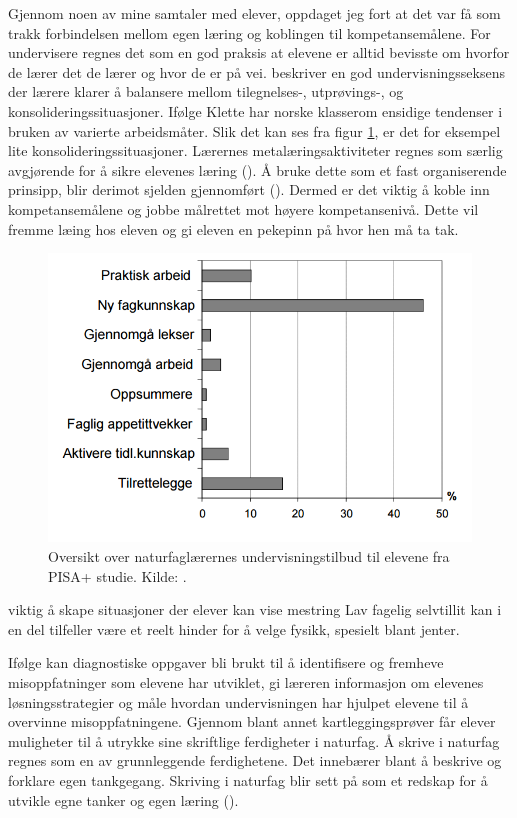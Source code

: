 \documentclass[main.tex]{subfiles}
\begin{document}
Gjennom noen av mine samtaler med elever, oppdaget jeg fort at det var få som trakk forbindelsen mellom egen læring og koblingen til kompetansemålene. For undervisere regnes det som en god praksis at elevene er alltid bevisste om hvorfor de lærer det de lærer og hvor de er på vei.  beskriver en god undervisningsseksens der lærere klarer å balansere mellom tilegnelses-, utprøvings-, og konsolideringssituasjoner. Ifølge Klette har norske klasserom ensidige tendenser i bruken av varierte arbeidsmåter. Slik det kan ses fra figur \ref{fig:odeg10}, er det for eksempel lite konsolideringssituasjoner. Lærernes metalæringsaktiviteter regnes som særlig avgjørende for å sikre elevenes læring (). Å bruke dette som et fast organiserende prinsipp, blir derimot sjelden gjennomført (). Dermed er det viktig å koble inn kompetansemålene og jobbe målrettet mot høyere kompetansenivå. Dette vil fremme læing hos eleven og gi eleven en pekepinn på hvor hen må ta tak.
\begin{figure}[h!]
\includegraphics[scale = 0.6]{../figures/undervisnings_aktivitet.png}
\caption{Oversikt over naturfaglærernes undervisningstilbud til elevene fra PISA+ studie. Kilde: 
\protect{}.}
\label{fig:odeg10}
\end{figure}

viktig å skape situasjoner der elever kan vise mestring  
Lav fagelig selvtillit kan i en del tilfeller være et reelt hinder for å velge fysikk, spesielt blant jenter.


Ifølge  kan diagnostiske oppgaver bli brukt til å identifisere og 
fremheve misoppfatninger som elevene har utviklet, gi læreren informasjon om elevenes løsningsstrategier og måle hvordan 
undervisningen har hjulpet elevene til å overvinne misoppfatningene. Gjennom blant annet kartleggingsprøver får elever 
muligheter til å utrykke sine skriftlige ferdigheter i naturfag. Å skrive i naturfag regnes som en av grunnleggende 
ferdighetene. Det innebærer blant å beskrive og forklare egen tankgegang. Skriving i naturfag blir sett på som et redskap for å utvikle egne tanker og egen læring (). 
\end{document}
